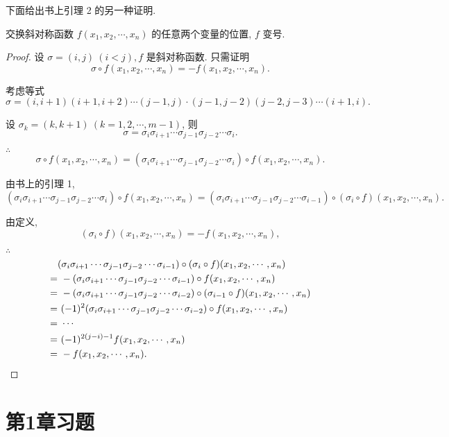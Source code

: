 \documentclass{ctexart}
\begin{document}
下面给出书上引理 2 的另一种证明.
\begin{lemma}[书上的引理 2]
    交换斜对称函数 $f(x_1,x_2,\cdots,x_n)$ 的任意两个变量的位置, $f$ 变号.
\end{lemma}
\begin{proof}
    设 $\sigma=(i,j)\ (i<j),f$ 是斜对称函数. 只需证明
    \[\sigma\circ f(x_1,x_2,\cdots,x_n)=-f(x_1,x_2,\cdots,x_n).\]

    考虑等式
    \[\sigma=(i,i+1)(i+1,i+2)\cdots(j-1,j)\cdot(j-1,j-2)(j-2,j-3)\cdots(i+1,i).\]

    设 $\sigma_k=(k,k+1)\ (k=1,2,\cdots,m-1)$, 则
    \[\sigma=\sigma_i\sigma_{i+1}\cdots\sigma_{j-1}\sigma_{j-2}\cdots\sigma_i.\]

    $\therefore$
    \[\sigma\circ f(x_1,x_2,\cdots,x_n)=(\sigma_i\sigma_{i+1}\cdots\sigma_{j-1}\sigma_{j-2}\cdots\sigma_i)\circ f(x_1,x_2,\cdots,x_n).\]

    由书上的引理 1,
    \[(\sigma_i\sigma_{i+1}\cdots\sigma_{j-1}\sigma_{j-2}\cdots\sigma_i)\circ f(x_1,x_2,\cdots,x_n)=(\sigma_i\sigma_{i+1}\cdots\sigma_{j-1}\sigma_{j-2}\cdots\sigma_{i-1})\circ(\sigma_i\circ f)(x_1,x_2,\cdots,x_n).\]

    由定义,
    \[(\sigma_i\circ f)(x_1,x_2,\cdots,x_n)=-f(x_1,x_2,\cdots,x_n),\]

    $\therefore$
    \begin{align*}
        & (\sigma_i\sigma_{i+1}\cdots\sigma_{j-1}\sigma_{j-2}\cdots\sigma_{i-1})\circ(\sigma_i\circ f)(x_1,x_2,\cdots,x_n)\\
        = & \ -(\sigma_i\sigma_{i+1}\cdots\sigma_{j-1}\sigma_{j-2}\cdots\sigma_{i-1})\circ f(x_1,x_2,\cdots,x_n) \\
        = & \ -(\sigma_i\sigma_{i+1}\cdots\sigma_{j-1}\sigma_{j-2}\cdots\sigma_{i-2})\circ(\sigma_{i-1}\circ f)(x_1,x_2,\cdots,x_n) \\
        = & \ (-1)^2(\sigma_i\sigma_{i+1}\cdots\sigma_{j-1}\sigma_{j-2}\cdots\sigma_{i-2})\circ f(x_1,x_2,\cdots,x_n) \\
        = & \ \cdots \\
        = & \ (-1)^{2(j-i)-1}f(x_1,x_2,\cdots,x_n) \\
        = & \ -f(x_1,x_2,\cdots,x_n).\qedhere
    \end{align*}
\end{proof}
\section{第1章习题}
\end{document}
